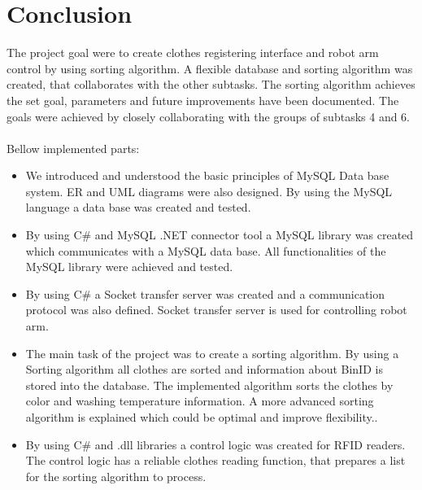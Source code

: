 \section{Conclusion}


The project goal were to create clothes registering interface and robot arm control by using sorting algorithm. A flexible database and sorting algorithm was created, that collaborates with the other subtasks. The sorting algorithm achieves the set goal, parameters and future improvements have been documented. The goals were achieved by closely collaborating with the groups of subtasks 4 and 6. 
\\ \\
Bellow implemented parts:
\\
\begin{itemize}
	\item We introduced and understood the basic principles of MySQL Data base system. ER and UML diagrams were also designed. By using the MySQL language a data base was created and tested.

	\item By using C\# and MySQL .NET connector tool a MySQL library was created which communicates with a MySQL data base. All functionalities of the MySQL library were achieved and tested.

	\item By using C\# a Socket transfer server was created and a communication protocol was also defined. Socket transfer server is used for controlling robot arm.

	\item The main task of the project was to create a sorting algorithm. By using a Sorting algorithm all clothes are sorted and information about BinID is stored into the
database. The implemented algorithm sorts the clothes by color and washing temperature information. A more advanced sorting algorithm is explained which could be optimal and improve flexibility..

	\item By using C\# and .dll libraries a control logic was created for RFID readers. The control logic has a reliable clothes reading function, that prepares a list for the sorting algorithm to process.
\end{itemize}